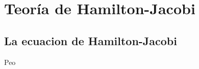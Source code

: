 \documentclass[../main.tex]{subfiles}
\begin{document}
\chapter{Teoría de Hamilton-Jacobi}

\section{La ecuacion de Hamilton-Jacobi}
Peo
\end{document}
